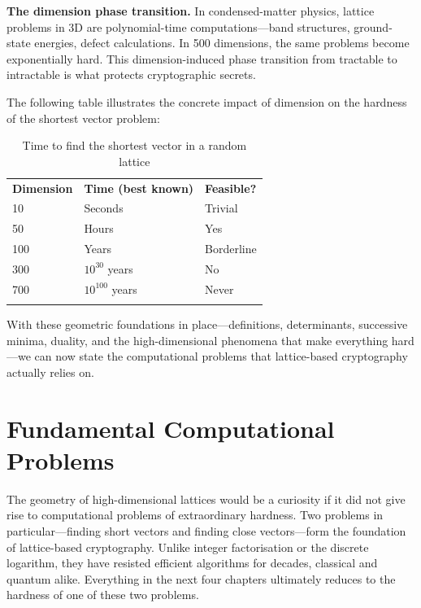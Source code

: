 \begin{svgraybox}
\textbf{The dimension phase transition.}
In condensed-matter physics, lattice problems in 3D are polynomial-time computations---band structures, ground-state energies, defect calculations.  In 500 dimensions, the same problems become exponentially hard.  This dimension-induced phase transition from tractable to intractable is what protects cryptographic secrets.
\end{svgraybox}

The following table illustrates the concrete impact of dimension on the hardness of the shortest vector problem:

\begin{table}[t]
\caption{Time to find the shortest vector in a random lattice}
\label{tab:svp-dimension}
\begin{tabular}{p{2.5cm}p{4cm}p{3cm}}
\hline\noalign{\smallskip}
\textbf{Dimension} & \textbf{Time (best known)} & \textbf{Feasible?} \\
\noalign{\smallskip}\svhline\noalign{\smallskip}
10  & Seconds        & Trivial \\
50  & Hours          & Yes \\
100 & Years          & Borderline \\
300 & $10^{30}$ years & No \\
700 & $10^{100}$ years & Never \\
\noalign{\smallskip}\hline
\end{tabular}
\end{table}

With these geometric foundations in place---definitions, determinants, successive minima, duality, and the high-dimensional phenomena that make everything hard---we can now state the computational problems that lattice-based cryptography actually relies on.


\section{Fundamental Computational Problems}
\label{sec:lattice-problems}

The geometry of high-dimensional lattices would be a curiosity if it did not give rise to computational problems of extraordinary hardness.  Two problems in particular---finding short vectors and finding close vectors---form the foundation of lattice-based cryptography.  Unlike integer factorisation or the discrete logarithm, they have resisted efficient algorithms for decades, classical and quantum alike.  Everything in the next four chapters ultimately reduces to the hardness of one of these two problems.

